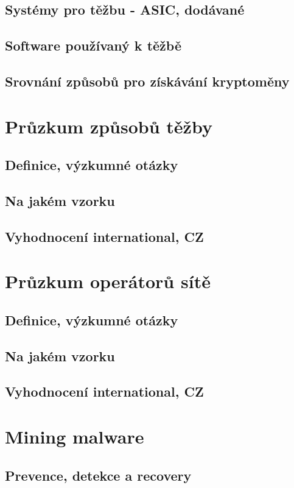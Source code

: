 \documentclass[
  printed, %
  table,   %
  nolof,     %
  nolot,     %
           oneside, color
]{fithesis3}
\begin{document}
\section{Systémy pro těžbu - ASIC, dodávané}
\section{Software používaný k těžbě}
\section{Srovnání způsobů pro získávání kryptoměny}

\chapter{Průzkum způsobů těžby}
\section{Definice, výzkumné otázky}
\section{Na jakém vzorku}
\section{Vyhodnocení international, CZ}



\chapter{Průzkum operátorů sítě}
\section{Definice, výzkumné otázky}
\section{Na jakém vzorku}
\section{Vyhodnocení international, CZ}

 
\chapter{Mining malware}
\section{Prevence, detekce a recovery}
\end{document}
